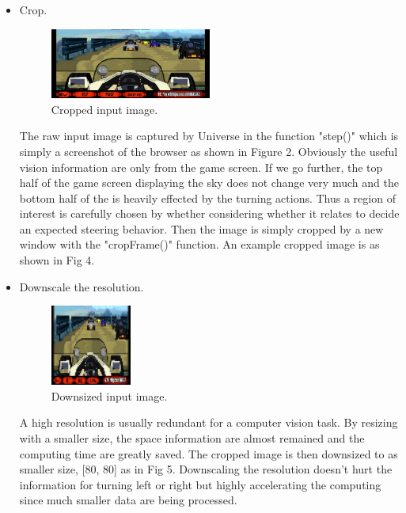 \documentclass[a4paper]{article}
\begin{document}
\begin{itemize}

    \item Crop.
    
    	\begin{figure}[h]
   	 \centering
   	 \includegraphics[width=0.5\textwidth]{coaster-racer-vision-cropped}
    	\caption{Cropped input image.}
    	\end{figure}
    
    The raw input image is captured by Universe in the function "step()" which is simply a screenshot of the browser as shown in Figure 2. Obviously the useful vision information are only from the game screen. If we go further, the top half of the game screen displaying the sky does not change very much and the bottom half of the is heavily effected by the turning actions. Thus a region of interest is carefully chosen by whether considering whether it relates to decide an expected steering behavior.  Then the image is simply cropped by a new window with the "cropFrame()" function. An example cropped image is as shown in Fig 4.   
    
    \item Downscale the resolution.

    	\begin{figure}[h]
    	\centering
   	 \includegraphics[width=0.25\textwidth]{coaster-racer-vision-downsized}
   	 \caption{Downsized input image.}
    	\end{figure}
    
    A high resolution is usually redundant for a computer vision task. By resizing with a smaller size, the space information are almost remained and the computing time are greatly saved. The cropped image is then downsized to as smaller size, [80, 80] as in Fig 5. Downscaling the resolution doesn't hurt the information for turning left or right but highly accelerating the computing since much smaller data are being processed.
    

\end{itemize}
\end{document}
